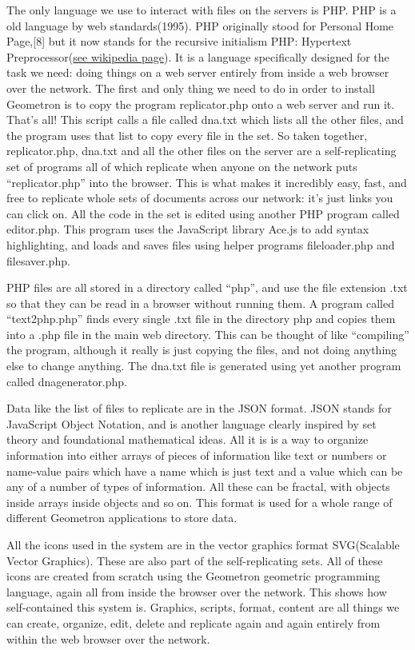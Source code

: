 The only language we use to interact with files on the servers is PHP.
PHP is a old language by web standards(1995). PHP originally stood for
Personal Home Page,{[}8{]} but it now stands for the recursive
initialism PHP: Hypertext
Preprocessor(\href{https://en.wikipedia.org/wiki/PHP}{see wikipedia
page}). It is a language specifically designed for the task we need:
doing things on a web server entirely from inside a web browser over the
network. The first and only thing we need to do in order to install
Geometron is to copy the program replicator.php onto a web server and
run it. That's all! This script calls a file called dna.txt which lists
all the other files, and the program uses that list to copy every file
in the set. So taken together, replicator.php, dna.txt and all the other
files on the server are a self-replicating set of programs all of which
replicate when anyone on the network puts ``replicator.php'' into the
browser. This is what makes it incredibly easy, fast, and free to
replicate whole sets of documents across our network: it's just links
you can click on. All the code in the set is edited using another PHP
program called editor.php. This program uses the JavaScript library
Ace.js to add syntax highlighting, and loads and saves files using
helper programs fileloader.php and filesaver.php.

PHP files are all stored in a directory called ``php'', and use the file
extension .txt so that they can be read in a browser without running
them. A program called ``text2php.php'' finds every single .txt file in
the directory php and copies them into a .php file in the main web
directory. This can be thought of like ``compiling'' the program,
although it really is just copying the files, and not doing anything
else to change anything. The dna.txt file is generated using yet another
program called dnagenerator.php.

Data like the list of files to replicate are in the JSON format. JSON
stands for JavaScript Object Notation, and is another language clearly
inspired by set theory and foundational mathematical ideas. All it is is
a way to organize information into either arrays of pieces of
information like text or numbers or name-value pairs which have a name
which is just text and a value which can be any of a number of types of
information. All these can be fractal, with objects inside arrays inside
objects and so on. This format is used for a whole range of different
Geometron applications to store data.

All the icons used in the system are in the vector graphics format
SVG(Scalable Vector Graphics). These are also part of the
self-replicating sets. All of these icons are created from scratch using
the Geometron geometric programming language, again all from inside the
browser over the network. This shows how self-contained this system is.
Graphics, scripts, format, content are all things we can create,
organize, edit, delete and replicate again and again entirely from
within the web browser over the network.

